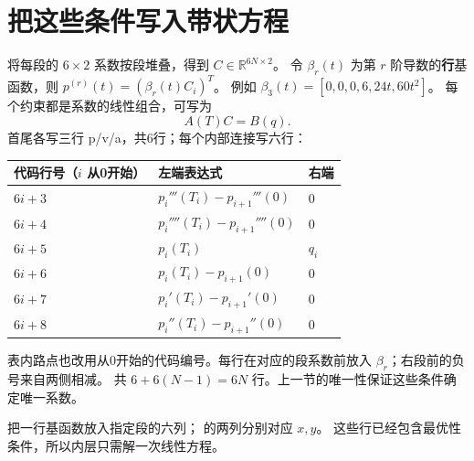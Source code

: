 \section{把这些条件写入带状方程}
将每段的 $6\times2$ 系数按段堆叠，得到 $C\in\mathbb R^{6N\times2}$。
令 $\beta_r(t)$ 为第 $r$ 阶导数的\textbf{行}基函数，则 $p^{(r)}(t)=(\beta_r(t)C_i)^T$。
例如 $\beta_3(t)=[0,0,0,6,24t,60t^2]$。
每个约束都是系数的线性组合，可写为
\begin{equation}
 A(T)C=B(q).
 \label{eq:minco-system}
\end{equation}
首尾各写三行 p/v/a，共6行；每个内部连接写六行：
\begin{center}\small
\begin{tabular}{lll}\toprule
代码行号（$i$ 从0开始）& 左端表达式 & 右端\\\midrule
$6i+3$ & $p_i'''(T_i)-p_{i+1}'''(0)$ & 0\\
$6i+4$ & $p_i''''(T_i)-p_{i+1}''''(0)$ & 0\\
$6i+5$ & $p_i(T_i)$ & $q_i$\\
$6i+6$ & $p_i(T_i)-p_{i+1}(0)$ & 0\\
$6i+7$ & $p_i'(T_i)-p_{i+1}'(0)$ & 0\\
$6i+8$ & $p_i''(T_i)-p_{i+1}''(0)$ & 0\\\bottomrule
\end{tabular}
\end{center}
表内路点也改用从0开始的代码编号。每行在对应的段系数前放入 $\beta_r$；右段前的负号来自两侧相减。
共 $6+6(N-1)=6N$ 行。上一节的唯一性保证这些条件确定唯一系数。
\par\noindent
\begin{minipage}{\linewidth}

\end{minipage}
\par
{} 把一行基函数放入指定段的六列； 的两列分别对应 $x,y$。
这些行已经包含最优性条件，所以内层只需解一次线性方程。

